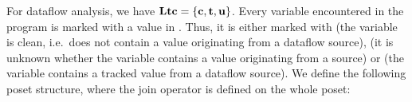 For dataflow analysis, we have $\textbf{Ltc} = \{\textbf{c}, \textbf{t}, \textbf{u}\}$.
Every variable encountered in the program is marked with a value in \lattice.
Thus, it is either marked with \lclean{} (the variable
is clean, i.e.\ does not contain a value originating from a dataflow source), \lunknown{}
(it is unknown whether the variable contains a value originating from a source) or \ltracked{}
(the variable contains a tracked value from a dataflow source).
We define the following poset structure, where the join operator is defined on the whole
poset:
\begin{figure}[h]
    \centering
\end{figure}

